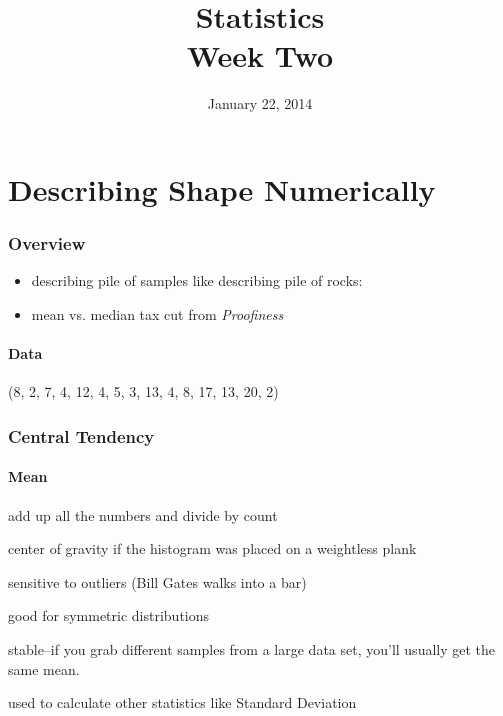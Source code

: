 \documentclass{exam}
\author{}
\date{January 22, 2014}
\title{Statistics \\ Week Two}
\begin{document}
  \maketitle
  \tableofcontents

  \pagebreak

  \part{Describing Shape Numerically}

  \section{Overview}

  \begin{itemize}
    \item describing pile of samples like describing pile of rocks:

    \item mean vs. median tax cut from {\em Proofiness}

  \end{itemize}

  \subsection{Data}
  (8, 2, 7, 4, 12, 4, 5, 3, 13, 4, 8, 17, 13, 20, 2)

  \section{Central Tendency}

  \subsection{Mean}

  \begin{itemize*}
    \item add up all the numbers and divide by count

    \item center of gravity if the histogram was placed on a weightless plank

    \item sensitive to outliers (Bill Gates walks into a bar)

    \item good for symmetric distributions

    \item stable--if you grab different samples from a large data set, you'll usually get
      the same mean.

    \item used to calculate other statistics like Standard Deviation
  \end{itemize*}
\end{document}

